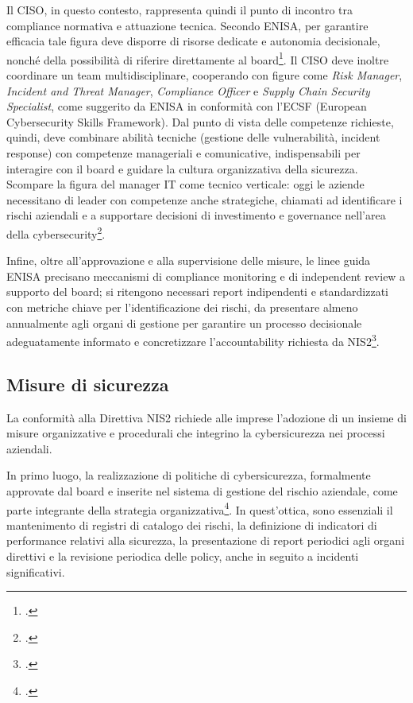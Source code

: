 Il CISO, in questo contesto, rappresenta quindi il punto di incontro tra compliance normativa e attuazione tecnica. Secondo ENISA, per 
garantire efficacia tale figura deve disporre di risorse dedicate e autonomia decisionale, 
nonché della possibilità di riferire direttamente al board\footcite[p. 23]{enisa-cybersecurity-roles}. 
Il CISO deve inoltre coordinare un team multidisciplinare, cooperando con figure come \textit{Risk Manager}, \textit{Incident and Threat Manager}, 
\textit{Compliance Officer} e \textit{Supply Chain Security Specialist}, come suggerito da ENISA in conformità con l'ECSF 
(European Cybersecurity Skills Framework). Dal punto di vista delle competenze richieste, 
quindi, deve combinare abilità tecniche (gestione delle vulnerabilità, incident response) con competenze manageriali e comunicative, 
indispensabili per interagire con il board e guidare la cultura organizzativa della sicurezza. 
Scompare la figura del manager IT come tecnico verticale: oggi le aziende necessitano di leader con competenze anche strategiche, 
chiamati ad identificare i rischi aziendali e a supportare decisioni di investimento
e governance nell'area della cybersecurity\footcite[pp. 32--34]{kouns-ciso}.

Infine, oltre all’approvazione e alla supervisione delle misure, le linee guida ENISA precisano meccanismi di compliance monitoring e 
di independent review a supporto del board; si ritengono necessari report indipendenti e standardizzati con metriche chiave per l'identificazione dei rischi,
da presentare almeno annualmente agli organi di gestione per garantire un processo decisionale adeguatamente informato e concretizzare l'accountability
richiesta da NIS2\footcite[pp. 21--25]{enisa-implementing-guidance}.


\subsection{Misure di sicurezza}
La conformità alla Direttiva NIS2 richiede alle imprese l’adozione di un insieme di misure 
organizzative e procedurali che integrino la cybersicurezza nei processi aziendali.

In primo luogo, la realizzazione di politiche di cybersicurezza, formalmente approvate dal board 
e inserite nel sistema di gestione del rischio aziendale, come parte integrante 
della strategia organizzativa\footcite[Allegato]{regolamento-2690}.
In quest'ottica, sono essenziali il mantenimento di registri di catalogo dei rischi, la definizione di indicatori 
di performance relativi alla sicurezza, la presentazione di report periodici agli organi direttivi 
e la revisione periodica delle policy, anche in seguito a incidenti significativi.

